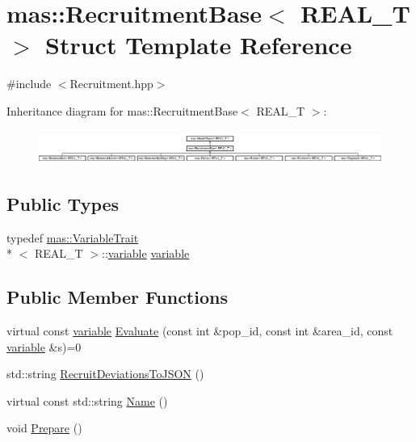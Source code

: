 \hypertarget{structmas_1_1_recruitment_base}{\section{mas\-:\-:Recruitment\-Base$<$ R\-E\-A\-L\-\_\-\-T $>$ Struct Template Reference}
\label{structmas_1_1_recruitment_base}
}


{\ttfamily \#include $<$Recruitment.\-hpp$>$}

Inheritance diagram for mas\-:\-:Recruitment\-Base$<$ R\-E\-A\-L\-\_\-\-T $>$\-:\begin{figure}[H]
\begin{center}
\leavevmode
\includegraphics[height=1.121495cm]{structmas_1_1_recruitment_base}
\end{center}
\end{figure}
\subsection*{Public Types}
\begin{DoxyCompactItemize}
\item 
typedef \hyperlink{structmas_1_1_variable_trait}{mas\-::\-Variable\-Trait}\\*
$<$ R\-E\-A\-L\-\_\-\-T $>$\-::\hyperlink{structmas_1_1_recruitment_base_acc579cce5a745bcbb31758b3420c960b}{variable} \hyperlink{structmas_1_1_recruitment_base_acc579cce5a745bcbb31758b3420c960b}{variable}
\end{DoxyCompactItemize}
\subsection*{Public Member Functions}
\begin{DoxyCompactItemize}
\item 
virtual const \hyperlink{structmas_1_1_recruitment_base_acc579cce5a745bcbb31758b3420c960b}{variable} \hyperlink{structmas_1_1_recruitment_base_a74a7f9dd7090f156c6a5068ce29f53ff}{Evaluate} (const int \&pop\-\_\-id, const int \&area\-\_\-id, const \hyperlink{structmas_1_1_recruitment_base_acc579cce5a745bcbb31758b3420c960b}{variable} \&s)=0
\item 
std\-::string \hyperlink{structmas_1_1_recruitment_base_abbfe6d0214fd35a775027ad54e3d10f6}{Recruit\-Deviations\-To\-J\-S\-O\-N} ()
\item 
virtual const std\-::string \hyperlink{structmas_1_1_recruitment_base_abfdd47e97127a35f81d441ac3e1afaec}{Name} ()
\item 
void \hyperlink{structmas_1_1_recruitment_base_a6cb0c256e576b95deebc997bd5aa6b64}{Prepare} ()
\end{DoxyCompactItemize}
